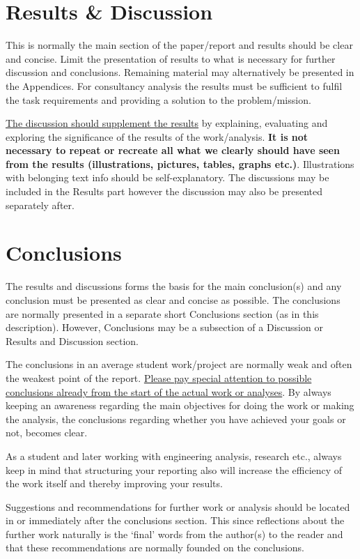 \documentclass[a4paper,12pt]{extarticle}
\begin{document}
\section{Results \& Discussion}
This is normally the main section of the paper/report and results should be clear and concise. Limit the presentation of results to what is necessary for further discussion and conclusions. Remaining material may alternatively be presented in the Appendices. For consultancy analysis the results must be sufficient to fulfil the task requirements and providing a solution to the problem/mission.

\ul{The discussion should supplement the results} by explaining, evaluating and exploring the significance of the results of the work/analysis. \textbf{It is not necessary to repeat or recreate all what we clearly should have seen from the results (illustrations, pictures, tables, graphs etc.)}. Illustrations with belonging text info should be self-explanatory. The discussions may be included in the Results part however the discussion may also be presented separately after.

\section{Conclusions}
The results and discussions forms the basis for the main conclusion(s) and any conclusion must be presented as clear and concise as possible. The conclusions are normally presented in a separate short Conclusions section (as in this description). However, Conclusions may be a subsection of a Discussion or Results and Discussion section.

The conclusions in an average student work/project are normally weak and often the weakest point of the report. \ul{Please pay special attention to possible conclusions already from the start of the actual work or analyses}. By always keeping an awareness regarding the main objectives for doing the work or making the analysis, the conclusions regarding whether you have achieved your goals or not, becomes clear.

As a student and later working with engineering analysis, research etc., always keep in mind that structuring your reporting also will increase the efficiency of the work itself and thereby improving your results.

Suggestions and recommendations for further work or analysis should be located in or immediately after the conclusions section. This since reflections about the further work naturally is the ‘final’ words from the author(s) to the reader and that these recommendations are normally founded on the conclusions. 
\end{document}
